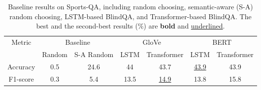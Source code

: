 \begin{table}[tbp]
\caption{Baseline results on Sports-QA, including random choosing, semantic-aware (S-A) random choosing, LSTM-based BlindQA, and Transformer-based BlindQA. The best and the second-best results (\%) are \textbf{bold} and \underline{underlined}.} 
\label{bl}
\begin{tabular}{@{}ccccccc@{}}
\toprule
\multirow{2}{*}{Metric} & \multicolumn{2}{c}{Baseline} & \multicolumn{2}{c}{GloVe}            & \multicolumn{2}{c}{BERT}                    \\\cmidrule(l){2-3} \cmidrule(l){4-5} \cmidrule(l){6-7} 
                        & Random   & S-A Random   & LSTM & Transformer                   & LSTM                          & Transformer \\ \midrule
Accuracy                & 0.5      & 24.6         & 44   & 43.7                          & \underline{43.9} & 43.9        \\
F1-score                & 0.3      & 5.4          & 13.5 & \underline{14.9} & 13.8                          & 15.8        \\ \bottomrule
\end{tabular}
\end{table}

